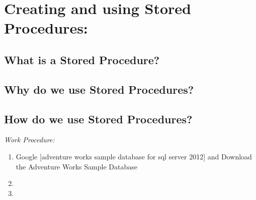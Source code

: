 \section {Creating and using Stored Procedures:}


\subsection{What is a Stored Procedure?}


\subsection{Why do we use Stored Procedures?}


\subsection{How do we use Stored Procedures?}



\emph{Work Procedure:}

\begin{enumerate}
    \item Google [adventure works sample database for sql server 2012] and Download the Adventure Works Sample Database
    \item 
    \item 
\end{enumerate}